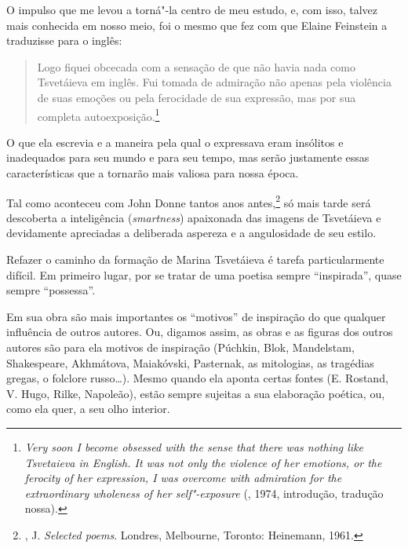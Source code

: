 O impulso que me levou a torná"-la centro de meu estudo, e,
com isso, talvez mais conhecida em nosso meio, foi o mesmo que
fez com que Elaine Feinstein a traduzisse para o inglês:

\begin{quotation}
Logo fiquei obcecada com a sensação de que não havia nada como
Tsvetáieva em inglês. Fui tomada de admiração não apenas pela
violência de suas emoções ou pela ferocidade de sua expressão,
mas por sua completa autoexposição.\footnote{\emph{Very soon I
become obsessed with the sense that there was nothing like
Tsvetaieva in English. It was not only the violence of her
emotions, or the ferocity of her expression, I was overcome
with admiration for the extraordinary wholeness of her
self"-exposure} (, 1974, introdução,
tradução nossa).}
\end{quotation}

O que ela escrevia e a maneira pela qual o expressava eram
insólitos e inadequados para seu mundo e para seu tempo, mas
serão justamente essas características que a tornarão mais
valiosa para nossa época.

Tal como aconteceu com John Donne tantos anos
antes,\footnote{, J. \emph{Selected poems}.
Londres, Melbourne, Toronto: Heinemann, 1961.} só mais tarde
será descoberta a inteligência (\emph{smartness}) apaixonada
das imagens de Tsvetáieva e devidamente apreciadas a
deliberada aspereza e a angulosidade de seu estilo.

Refazer o caminho da formação de Marina Tsvetáieva é tarefa
particularmente difícil. Em primeiro lugar, por se tratar de
uma poetisa sempre ``inspirada'', quase sempre ``possessa''.

Em sua obra são mais importantes os ``motivos'' de inspiração do
que qualquer influência de outros autores. Ou, digamos assim, as
obras e as figuras dos outros autores são para ela motivos de
inspiração (Púchkin, Blok, Mandelstam, Shakespeare, Akhmátova,
Maiakóvski, Pasternak, as mitologias, as tragédias gregas, o
folclore russo\ldots{}). Mesmo quando ela aponta certas fontes
(E. Rostand, V. Hugo, Rilke, Napoleão), estão sempre sujeitas a
sua elaboração poética, ou, como ela quer, a seu olho interior.

